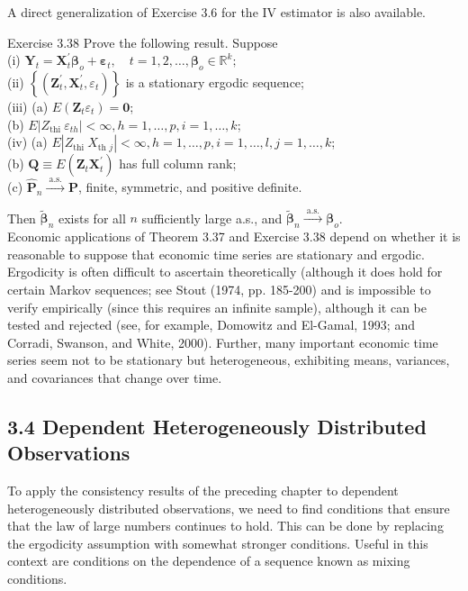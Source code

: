 \documentclass[10pt]{article}
\begin{document}
A direct generalization of Exercise 3.6 for the IV estimator is also available.

Exercise 3.38 Prove the following result. Suppose\\
(i) $\mathbf{Y}_{t}=\mathbf{X}_{t}^{\prime} \boldsymbol{\beta}_{o}+\boldsymbol{\varepsilon}_{t}, \quad t=1,2, \ldots, \boldsymbol{\beta}_{o} \in \mathbb{R}^{k} ;$\\
(ii) $\left\{\left(\mathbf{Z}_{t}^{\prime}, \mathbf{X}_{t}^{\prime}, \varepsilon_{t}\right)\right\}$ is a stationary ergodic sequence;\\
(iii) (a) $E\left(\mathbf{Z}_{t} \varepsilon_{t}\right)=\mathbf{0}$;\\
(b) $E\left|Z_{\text {thi }} \varepsilon_{t h}\right|<\infty, h=1, \ldots, p, i=1, \ldots, k$;\\
(iv) (a) $E\left|Z_{\text {thi }} X_{\text {th } j}\right|<\infty, h=1, \ldots, p, i=1, \ldots, l, j=1, \ldots, k$;\\
(b) $\mathbf{Q} \equiv E\left(\mathbf{Z}_{t} \mathbf{X}_{t}^{\prime}\right)$ has full column rank;\\
(c) $\hat{\mathbf{P}}_{n} \xrightarrow{\text { a.s. }} \mathbf{P}$, finite, symmetric, and positive definite.

Then $\tilde{\boldsymbol{\beta}}_{n}$ exists for all $n$ sufficiently large a.s., and $\tilde{\boldsymbol{\beta}}_{n} \xrightarrow{\text { a.s. }} \boldsymbol{\beta}_{o}$.\\
Economic applications of Theorem 3.37 and Exercise 3.38 depend on whether it is reasonable to suppose that economic time series are stationary and ergodic. Ergodicity is often difficult to ascertain theoretically (although it does hold for certain Markov sequences; see Stout (1974, pp. 185-200) and is impossible to verify empirically (since this requires an infinite sample), although it can be tested and rejected (see, for example, Domowitz and El-Gamal, 1993; and Corradi, Swanson, and White, 2000). Further, many important economic time series seem not to be stationary but heterogeneous, exhibiting means, variances, and covariances that change over time.

\subsection*{3.4 Dependent Heterogeneously Distributed Observations}
To apply the consistency results of the preceding chapter to dependent heterogeneously distributed observations, we need to find conditions that ensure that the law of large numbers continues to hold. This can be done by replacing the ergodicity assumption with somewhat stronger conditions. Useful in this context are conditions on the dependence of a sequence known as mixing conditions.
\end{document}

